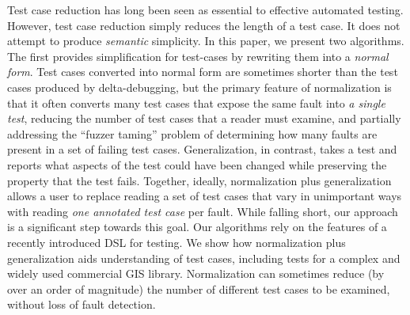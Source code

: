 Test case reduction has long been seen as essential to effective automated testing.  However, test case reduction simply reduces the length of a test case.  It does not attempt to produce \emph{semantic} simplicity.  In this paper, we present two algorithms.  The first provides simplification for test-cases by rewriting them into a \emph{normal form}.  Test cases converted into normal form are sometimes shorter than the test cases produced by delta-debugging, but the primary feature of normalization is that it often converts many test cases that expose the same fault into \emph{a single test}, reducing the number of test cases that a reader must examine, and partially addressing the ``fuzzer taming'' problem of determining how many faults are present in a set of failing test cases.  Generalization, in contrast, takes a test and reports what aspects of the test could have been changed while preserving the property that the test fails.  Together, ideally, normalization plus generalization allows a user to replace reading a set of test cases that vary in unimportant ways with reading \emph{one annotated test case} per fault.  While falling short, our approach is a significant step towards this goal.  Our algorithms rely on the features of a recently introduced DSL for testing.   We show how normalization plus generalization aids understanding of test cases, including tests for a complex and widely used commercial GIS library.  Normalization can sometimes reduce (by over an order of magnitude) the number of different test cases to be examined, without loss of fault detection.